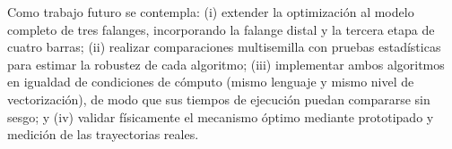 \documentclass[conference]{IEEEtran}
\begin{document}
Como trabajo futuro se contempla: (i) extender la optimización al modelo completo de tres falanges, incorporando la falange distal y la tercera etapa de cuatro barras; (ii) realizar comparaciones multisemilla con pruebas estadísticas para estimar la robustez de cada algoritmo; (iii) implementar ambos algoritmos en igualdad de condiciones de cómputo (mismo lenguaje y mismo nivel de vectorización), de modo que sus tiempos de ejecución puedan compararse sin sesgo; y (iv) validar físicamente el mecanismo óptimo mediante prototipado y medición de las trayectorias reales.


\end{document}
